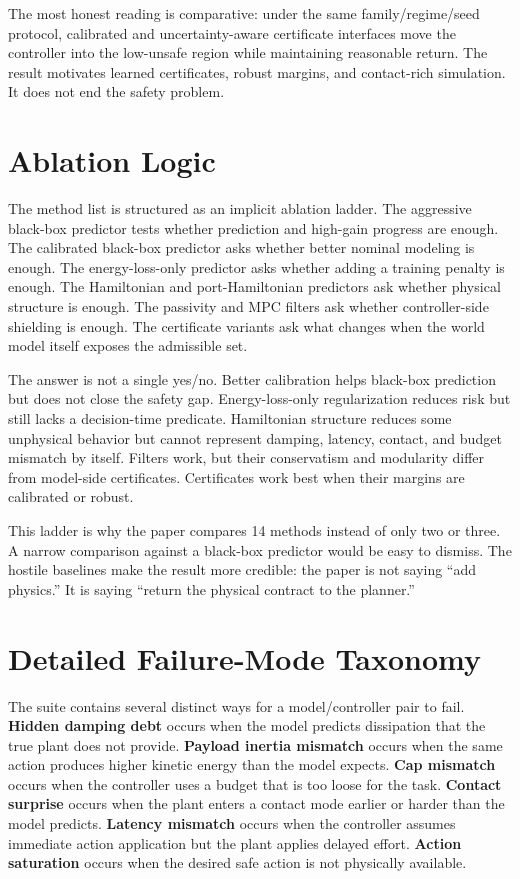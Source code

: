 \documentclass{article}
\begin{document}
The most honest reading is comparative: under the same family/regime/seed protocol, calibrated and uncertainty-aware certificate interfaces move the controller into the low-unsafe region while maintaining reasonable return. The result motivates learned certificates, robust margins, and contact-rich simulation. It does not end the safety problem.

\clearpage
\section{Ablation Logic}

The method list is structured as an implicit ablation ladder. The aggressive black-box predictor tests whether prediction and high-gain progress are enough. The calibrated black-box predictor asks whether better nominal modeling is enough. The energy-loss-only predictor asks whether adding a training penalty is enough. The Hamiltonian and port-Hamiltonian predictors ask whether physical structure is enough. The passivity and MPC filters ask whether controller-side shielding is enough. The certificate variants ask what changes when the world model itself exposes the admissible set.

The answer is not a single yes/no. Better calibration helps black-box prediction but does not close the safety gap. Energy-loss-only regularization reduces risk but still lacks a decision-time predicate. Hamiltonian structure reduces some unphysical behavior but cannot represent damping, latency, contact, and budget mismatch by itself. Filters work, but their conservatism and modularity differ from model-side certificates. Certificates work best when their margins are calibrated or robust.

This ladder is why the paper compares 14 methods instead of only two or three. A narrow comparison against a black-box predictor would be easy to dismiss. The hostile baselines make the result more credible: the paper is not saying ``add physics.'' It is saying ``return the physical contract to the planner.''

\section{Detailed Failure-Mode Taxonomy}

The suite contains several distinct ways for a model/controller pair to fail. \textbf{Hidden damping debt} occurs when the model predicts dissipation that the true plant does not provide. \textbf{Payload inertia mismatch} occurs when the same action produces higher kinetic energy than the model expects. \textbf{Cap mismatch} occurs when the controller uses a budget that is too loose for the task. \textbf{Contact surprise} occurs when the plant enters a contact mode earlier or harder than the model predicts. \textbf{Latency mismatch} occurs when the controller assumes immediate action application but the plant applies delayed effort. \textbf{Action saturation} occurs when the desired safe action is not physically available.
\end{document}
